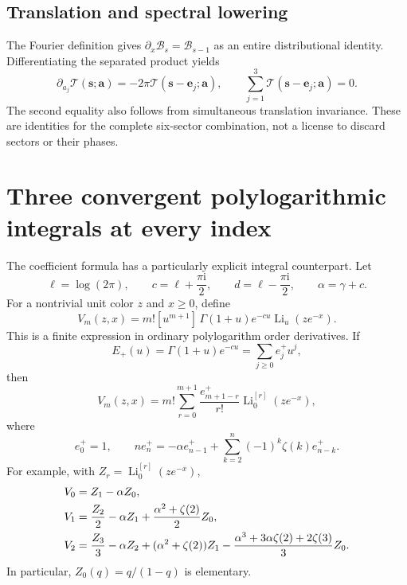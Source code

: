 \documentclass[11pt]{article}
\numberwithin{equation}{section}
\theoremstyle{definition}\newtheorem{definition}[theorem]{Definition}
\theoremstyle{remark}\newtheorem{remark}[theorem]{Remark}
\DeclareMathOperator{\Li}{Li}
\newcommand{\ii}{\mathrm i}
\newcommand{\calB}{\mathcal B}
\newcommand{\calT}{\mathcal T}
\begin{document}
\subsection{Translation and spectral lowering}
The Fourier definition gives $\partial_x\calB_s=\calB_{s-1}$ as an
entire distributional identity. Differentiating the separated product yields
\begin{equation}\label{tsc:lowering}
 \partial_{a_j}\calT(\mathbf s;\mathbf a)
       =-2\pi\calT(\mathbf s-\mathbf e_j;\mathbf a),
 \qquad
 \sum_{j=1}^3\calT(\mathbf s-\mathbf e_j;\mathbf a)=0.
\end{equation}
The second equality also follows from simultaneous translation invariance.
These are identities for the complete six-sector combination, not a license
to discard sectors or their phases.


\section{Three convergent polylogarithmic integrals at every index}\label{tsc:polylog-moments}
The coefficient formula has a particularly explicit integral counterpart.
Let
\begin{equation}\label{tsc:cdalpha}
 \ell=\log(2\pi),\qquad c=\ell+\frac{\pi\ii}{2},\qquad
 d=\ell-\frac{\pi\ii}{2},\qquad \alpha=\gamma+c.
\end{equation}
For a nontrivial unit color $z$ and $x\ge0$, define
\begin{equation}\label{tsc:Vdef}
 V_m(z,x)=m![u^{m+1}]\,
      \Gamma(1+u)e^{-cu}\Li_u(ze^{-x}).
\end{equation}
This is a finite expression in ordinary polylogarithm order derivatives.
If
\[
 E_+(u)=\Gamma(1+u)e^{-cu}=\sum_{j\ge0}e_j^+u^j,
\]
then
\begin{equation}\label{tsc:Vfinite}
 V_m(z,x)=m!\sum_{r=0}^{m+1}\frac{e_{m+1-r}^+}{r!}
                         \Li_0^{[r]}(ze^{-x}),
\end{equation}
where
\begin{equation}\label{tsc:e-recurrence}
 e_0^+=1,\qquad
 n e_n^+=-\alpha e_{n-1}^+
          +\sum_{k=2}^n(-1)^k\zeta(k)e_{n-k}^+.
\end{equation}
For example, with $Z_r=\Li_0^{[r]}(ze^{-x})$,
\begin{align}\label{tsc:Vexamples}
 V_0&=Z_1-\alpha Z_0,\notag\\
 V_1&=\frac{Z_2}{2}-\alpha Z_1+
                  \frac{\alpha^2+\zeta(2)}2Z_0,\notag\\
 V_2&=\frac{Z_3}{3}-\alpha Z_2+
      (\alpha^2+\zeta(2))Z_1
      -\frac{\alpha^3+3\alpha\zeta(2)+2\zeta(3)}3 Z_0.
\end{align}
In particular, $Z_0(q)=q/(1-q)$ is elementary.
\end{document}
